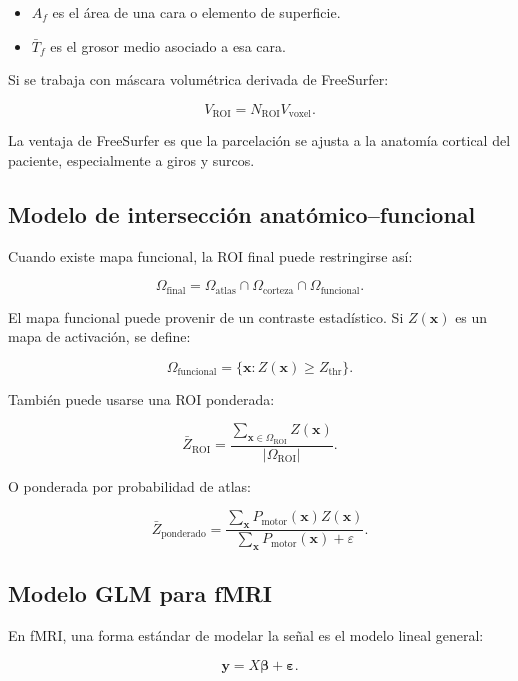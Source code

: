 \documentclass[12pt,a4paper]{article}
\begin{document}
\begin{itemize}
    \item \(A_f\) es el área de una cara o elemento de superficie.
    \item \(\bar{T}_f\) es el grosor medio asociado a esa cara.
\end{itemize}

Si se trabaja con máscara volumétrica derivada de FreeSurfer:

\[
V_{\text{ROI}}
=
N_{\text{ROI}}V_{\text{voxel}}.
\]

La ventaja de FreeSurfer es que la parcelación se ajusta a la anatomía cortical del paciente, especialmente a giros y surcos.

\subsection{Modelo de intersección anatómico--funcional}

Cuando existe mapa funcional, la ROI final puede restringirse así:

\[
\Omega_{\text{final}}
=
\Omega_{\text{atlas}}
\cap
\Omega_{\text{corteza}}
\cap
\Omega_{\text{funcional}}.
\]

El mapa funcional puede provenir de un contraste estadístico. Si \(Z(\mathbf{x})\) es un mapa de activación, se define:

\[
\Omega_{\text{funcional}}
=
\{\mathbf{x}:Z(\mathbf{x})\geq Z_{\text{thr}}\}.
\]

También puede usarse una ROI ponderada:

\[
\bar{Z}_{\text{ROI}}
=
\frac{
\sum_{\mathbf{x}\in\Omega_{\text{ROI}}}
Z(\mathbf{x})
}
{
|\Omega_{\text{ROI}}|
}.
\]

O ponderada por probabilidad de atlas:

\[
\bar{Z}_{\text{ponderado}}
=
\frac{
\sum_{\mathbf{x}}
P_{\text{motor}}(\mathbf{x})Z(\mathbf{x})
}
{
\sum_{\mathbf{x}}
P_{\text{motor}}(\mathbf{x})+\varepsilon
}.
\]

\subsection{Modelo GLM para fMRI}

En fMRI, una forma estándar de modelar la señal es el modelo lineal general:

\[
\mathbf{y}
=
X\boldsymbol{\beta}
+
\boldsymbol{\varepsilon}.
\]
\end{document}
